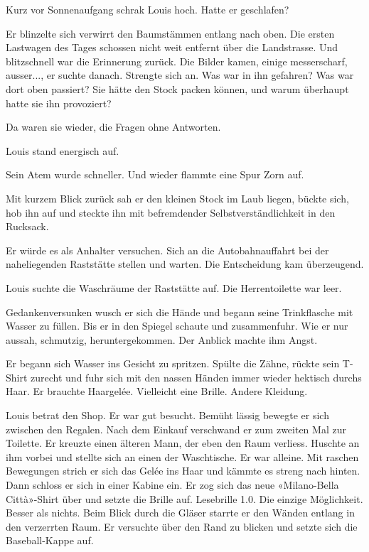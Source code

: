 Kurz vor Sonnenaufgang schrak Louis hoch. Hatte er geschlafen?

Er blinzelte sich verwirrt den Baumstämmen entlang nach oben. Die ersten
Lastwagen des Tages schossen nicht weit entfernt über die Landstrasse.
Und blitzschnell war die Erinnerung zurück. Die Bilder kamen, einige
messerscharf, ausser..., er suchte danach. Strengte sich an. Was war in
ihn gefahren? Was war dort oben passiert? Sie hätte den Stock packen
können, und warum überhaupt hatte sie ihn provoziert?

Da waren sie wieder, die Fragen ohne Antworten.

Louis stand energisch auf.

Sein Atem wurde schneller. Und wieder flammte eine Spur Zorn auf.

Mit kurzem Blick zurück sah er den kleinen Stock im Laub liegen, bückte
sich, hob ihn auf und steckte ihn mit befremdender
Selbstverständlichkeit in den Rucksack.

Er würde es als Anhalter versuchen. Sich an die Autobahnauffahrt bei der
naheliegenden Raststätte stellen und warten. Die Entscheidung kam
überzeugend.

Louis suchte die Waschräume der Raststätte auf. Die Herrentoilette war
leer.

Gedankenversunken wusch er sich die Hände und begann seine Trinkflasche
mit Wasser zu füllen. Bis er in den Spiegel schaute und zusammenfuhr.
Wie er nur aussah, schmutzig, heruntergekommen. Der Anblick machte ihm
Angst.

Er begann sich Wasser ins Gesicht zu spritzen. Spülte die Zähne, rückte
sein T-Shirt zurecht und fuhr sich mit den nassen Händen immer wieder
hektisch durchs Haar. Er brauchte Haargelée. Vielleicht eine Brille.
Andere Kleidung.

Louis betrat den Shop. Er war gut besucht. Bemüht lässig bewegte er sich
zwischen den Regalen. Nach dem Einkauf verschwand er zum zweiten Mal zur
Toilette. Er kreuzte einen älteren Mann, der eben den Raum verliess.
Huschte an ihm vorbei und stellte sich an einen der Waschtische. Er war
alleine. Mit raschen Bewegungen strich er sich das Gelée ins Haar und
kämmte es streng nach hinten. Dann schloss er sich in einer Kabine ein.
Er zog sich das neue «Milano-Bella Città»-Shirt über und setzte die
Brille auf. Lesebrille 1.0. Die einzige Möglichkeit. Besser als nichts.
Beim Blick durch die Gläser starrte er den Wänden entlang in den
verzerrten Raum. Er versuchte über den Rand zu blicken und setzte sich
die Baseball-Kappe auf.

